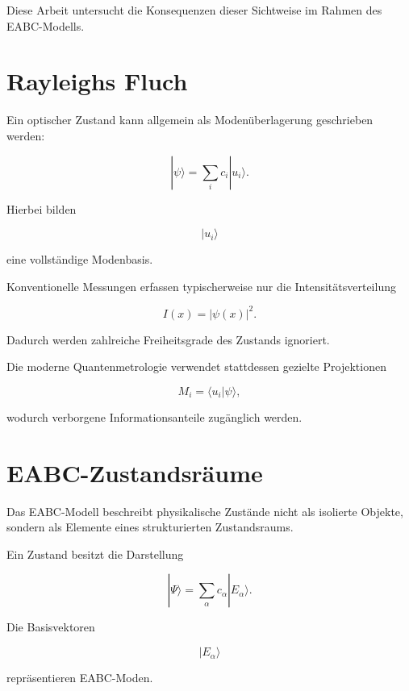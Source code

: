 \documentclass[11pt,a4paper]{article}
\theoremstyle{remark}
\begin{document}
	Diese Arbeit untersucht die Konsequenzen dieser Sichtweise im Rahmen des
	EABC-Modells.
	
	\section{Rayleighs Fluch}
	
	Ein optischer Zustand kann allgemein als Modenüberlagerung geschrieben
	werden:
	
	\begin{equation}
		|\psi\rangle
		=
		\sum_i c_i |u_i\rangle.
	\end{equation}
	
	Hierbei bilden
	
	\[
	|u_i\rangle
	\]
	
	eine vollständige Modenbasis.
	
	Konventionelle Messungen erfassen typischerweise nur die
	Intensitätsverteilung
	
	\begin{equation}
		I(x)
		=
		|\psi(x)|^2.
	\end{equation}
	
	Dadurch werden zahlreiche Freiheitsgrade des Zustands ignoriert.
	
	Die moderne Quantenmetrologie verwendet stattdessen gezielte
	Projektionen
	
	\begin{equation}
		M_i
		=
		\langle u_i|\psi\rangle,
	\end{equation}
	
	wodurch verborgene Informationsanteile zugänglich werden.
	
	\section{EABC-Zustandsräume}
	
	Das EABC-Modell beschreibt physikalische Zustände nicht als isolierte
	Objekte, sondern als Elemente eines strukturierten Zustandsraums.
	
	Ein Zustand besitzt die Darstellung
	
	\begin{equation}
		|\Psi\rangle
		=
		\sum_{\alpha}
		c_{\alpha}
		|E_{\alpha}\rangle.
	\end{equation}
	
	Die Basisvektoren
	
	\[
	|E_{\alpha}\rangle
	\]
	
	repräsentieren EABC-Moden.
	
\end{document}
